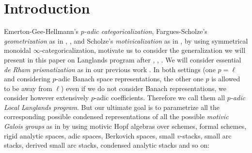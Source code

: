 \documentclass[12pt]{article}
\theoremstyle{definition}
\begin{document}
\newpage
\tableofcontents


\newpage
\section{Introduction}



\indent Emerton-Gee-Hellmann's \textit{$p$-adic categoricalization}, Fargues-Scholze's \textit{geometrization} as in \cite{1FS}, \cite{EGH1}, and Scholze's \textit{motivicalization} as in \cite{1S5}, \cite{1S6} by using symmetrical monoidal $\infty$-categoricalization, motivate us to consider the generalization we will present in this paper on Langlands program after \cite{L1}, \cite{D}, \cite{C}. We will consider essential \textit{de Rham prismatization} as in our previous work \cite{1T}. In both settings (one $p=\ell$ and considering $p$-adic Banach space representations, the other one $p$ is allowed to be away from $\ell$) even if we do not consider Banach representations, we consider however extensively $p$-adic coefficients. Therefore we call them all \textit{$p$-adic Local Langlands program}. But our ultimate goal is to parametrize all the corresponding possible condensed representations of all the possible \textit{motivic Galois groups} as in \cite{2A} by using motivic Hopf algebras over schemes, formal schemes, rigid analytic spaces, adic spaces, Berkovich spaces, small $v$-stacks, small arc stacks, derived small arc stacks, condensed analytic stacks and so on: 
\end{document}
